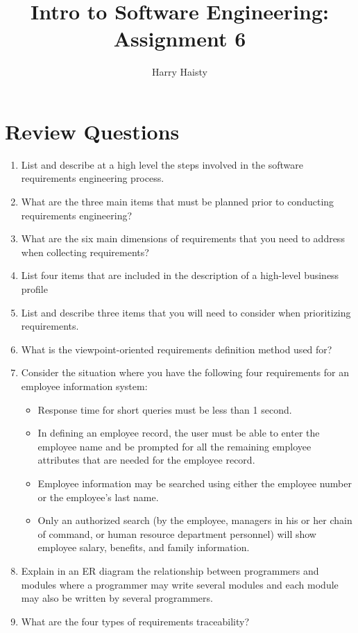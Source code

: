 \documentclass[11pt]{article}
\title{Intro to Software Engineering: Assignment 6}
\author{Harry Haisty}
\begin{document}
\maketitle
\section*{Review Questions}
\begin{enumerate}
\item List and describe at a high level the steps involved in the software requirements engineering process. 



\item What are the three main items that must be planned prior to conducting requirements engineering?

\item What are the six main dimensions of requirements that you need to address when collecting requirements?

\item List four items that are included in the description of a high-level business profile

\item List and describe three items that you will need to consider when prioritizing requirements.

\item What is the viewpoint-oriented requirements definition method used for?

\item Consider the situation where you have the following four requirements for an employee information system:
\begin{itemize}
    \item Response time for short queries must be less than 1 second. 
    \item In defining an employee record, the user must be able to enter the employee name and be prompted for all the remaining employee attributes that are needed for the employee record. 
    \item Employee information may be searched using either the employee number or the employee's last name. 
    \item Only an authorized search (by the employee, managers in his or her chain of command, or human resource department personnel) will show employee salary, benefits, and family information. 
\end{itemize}

\item Explain in an ER diagram the relationship between programmers and modules where a programmer may write several modules and each module may also be written by several programmers.

\item What are the four types of requirements traceability?

\end{enumerate}
\end{document}
